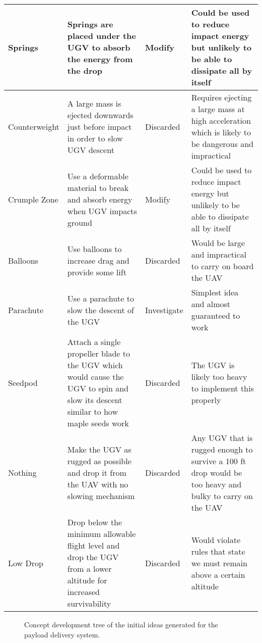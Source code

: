 \documentclass[]{auvsi_doc}
\begin{document}
\begin{center}
\begin{longtable}[H]{|p{}|p{}|p{}|p{}|}
\hline
Springs & Springs are placed under the UGV to absorb the energy from the drop & Modify & Could be used to reduce impact energy but unlikely to be able to dissipate all by itself \\
\hline
Counterweight & A large mass is ejected downwards just before impact in order to slow UGV descent & Discarded & Requires ejecting a large mass at high acceleration which is likely to be dangerous and impractical\\
\hline
Crumple Zone & Use a deformable material to break and absorb energy when UGV impacts ground & Modify & Could be used to reduce impact energy but unlikely to be able to dissipate all by itself\\
\hline
Balloons & Use balloons to increase drag and provide some lift & Discarded & Would be large and impractical to carry on board the UAV \\
\hline
Parachute & Use a parachute to slow the descent of the UGV & Investigate & Simplest idea and almost guaranteed to work \\
\hline
Seedpod & Attach a single propeller blade to the UGV which would cause the UGV to spin and slow its descent similar to how maple seeds work & Discarded & The UGV is likely too heavy to implement this properly\\
\hline
Nothing & Make the UGV as rugged as possible and drop it from the UAV with no slowing mechanism & Discarded & Any UGV that is rugged enough to survive a 100 ft drop would be too heavy and bulky to carry on the UAV \\
\hline
Low Drop & Drop below the minimum allowable flight level and drop the UGV from a lower altitude for increased survivability & Discarded & Would violate rules that state we must remain above a certain altitude\\
\hline
\end{longtable}
\end{center}


\begin{figure}
\centering
{}
\caption{Concept development tree of the initial ideas generated for the payload delivery system.}
\label{fig:ConceptTree}
\end{figure}
\end{document}
